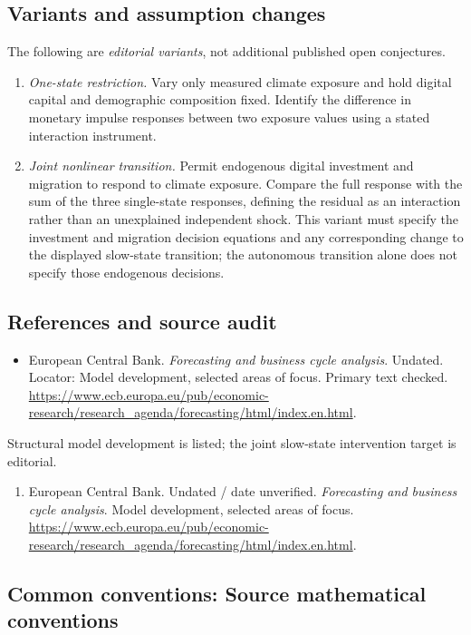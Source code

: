 \documentclass[11pt,a4paper]{article}
\begin{document}
\subsection*{Variants and assumption changes}
The following are \emph{editorial variants}, not additional published open conjectures.
\begin{enumerate}
\item \emph{One-state restriction.} Vary only measured climate exposure and hold digital capital and demographic composition fixed. Identify the difference in monetary impulse responses between two exposure values using a stated interaction instrument.
\item \emph{Joint nonlinear transition.} Permit endogenous digital investment and migration to respond to climate exposure. Compare the full response with the sum of the three single-state responses, defining the residual as an interaction rather than an unexplained independent shock. This variant must specify the investment and migration decision equations and any corresponding change to the displayed slow-state transition; the autonomous transition alone does not specify those endogenous decisions.
\end{enumerate}
\subsection*{References and source audit}
\begin{itemize}
\item European Central Bank. \emph{Forecasting and business cycle analysis}. Undated. Locator: Model development, selected areas of focus. Primary text checked. \url{https://www.ecb.europa.eu/pub/economic-research/research_agenda/forecasting/html/index.en.html}.
\end{itemize}
Structural model development is listed; the joint slow-state intervention target is editorial.
\begin{enumerate}\raggedright
\item\hypertarget{definitions:source:30007521:1}{} European Central Bank. Undated / date unverified. \emph{Forecasting and business cycle analysis}. Model development, selected areas of focus.
\url{https://www.ecb.europa.eu/pub/economic-research/research_agenda/forecasting/html/index.en.html}.
\end{enumerate}

\subsection*{Common conventions: Source mathematical conventions}
\end{document}
